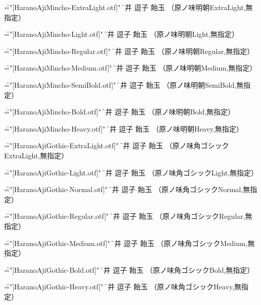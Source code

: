 
\nopagenumbers

\font\f="[HaranoAjiMincho-ExtraLight.otf]" \f
辻井 逗子 飴玉 （原ノ味明朝ExtraLight,無指定）\par

\font\f="[HaranoAjiMincho-Light.otf]" \f
辻井 逗子 飴玉 （原ノ味明朝Light,無指定）\par

\font\f="[HaranoAjiMincho-Regular.otf]" \f
辻井 逗子 飴玉 （原ノ味明朝Regular,無指定）\par

\font\f="[HaranoAjiMincho-Medium.otf]" \f
辻井 逗子 飴玉 （原ノ味明朝Medium,無指定）\par

\font\f="[HaranoAjiMincho-SemiBold.otf]" \f
辻井 逗子 飴玉 （原ノ味明朝SemiBold,無指定）\par

\font\f="[HaranoAjiMincho-Bold.otf]" \f
辻井 逗子 飴玉 （原ノ味明朝Bold,無指定）\par

\font\f="[HaranoAjiMincho-Heavy.otf]" \f
辻井 逗子 飴玉 （原ノ味明朝Heavy,無指定）\par


\font\f="[HaranoAjiGothic-ExtraLight.otf]" \f
辻井 逗子 飴玉 （原ノ味角ゴシックExtraLight,無指定）\par

\font\f="[HaranoAjiGothic-Light.otf]" \f
辻井 逗子 飴玉 （原ノ味角ゴシックLight,無指定）\par

\font\f="[HaranoAjiGothic-Normal.otf]" \f
辻井 逗子 飴玉 （原ノ味角ゴシックNormal,無指定）\par

\font\f="[HaranoAjiGothic-Regular.otf]" \f
辻井 逗子 飴玉 （原ノ味角ゴシックRegular,無指定）\par

\font\f="[HaranoAjiGothic-Medium.otf]" \f
辻井 逗子 飴玉 （原ノ味角ゴシックMedium,無指定）\par

\font\f="[HaranoAjiGothic-Bold.otf]" \f
辻井 逗子 飴玉 （原ノ味角ゴシックBold,無指定）\par

\font\f="[HaranoAjiGothic-Heavy.otf]" \f
辻井 逗子 飴玉 （原ノ味角ゴシックHeavy,無指定）\par


